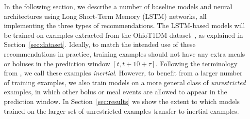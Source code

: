 \documentclass[graybox]{svmult}
\begin{document}
In the following section, we describe a number of baseline models and neural architectures using Long Short-Term Memory (LSTM) networks, all implementing the three types of recommendations. The LSTM-based models will be trained on examples extracted from the OhioT1DM dataset~\cite{ohiot1dm:marling:kdh18}, as explained in Section~\ref{sec:dataset}. Ideally, to match the intended use of these recommendations in practice, training examples should not have any extra meals or boluses in the prediction window $[t, t + 10 + \tau]$. Following the terminology from \cite{mirshekarian:embc19}, we call these examples {\it inertial}. However, to benefit from a larger number of training examples, we also train models on a more general class of {\it unrestricted} examples, in which other bolus or meal events are allowed to appear in the prediction window. In Section~\ref{sec:results} we show the extent to which models trained on the larger set of unrestricted examples transfer to inertial examples.


\end{document}
